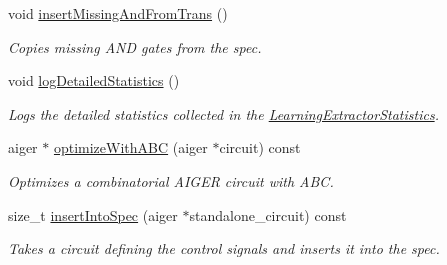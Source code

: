 \begin{DoxyCompactItemize}
void \hyperlink{classLearningImplExtractor_a8b95b5433b25e475efaaba9c553c4e63}{insert\-Missing\-And\-From\-Trans} ()
\begin{DoxyCompactList}\small\item\em Copies missing A\-N\-D gates from the spec. \end{DoxyCompactList}\item 
void \hyperlink{classLearningImplExtractor_aa14318d81871fc52f0d17fd5d82708e3}{log\-Detailed\-Statistics} ()
\begin{DoxyCompactList}\small\item\em Logs the detailed statistics collected in the \hyperlink{classLearningExtractorStatistics}{Learning\-Extractor\-Statistics}. \end{DoxyCompactList}\item 
aiger $\ast$ \hyperlink{classCNFImplExtractor_a58a4e5021d0ef9c4190a5be74fb5a83e}{optimize\-With\-A\-B\-C} (aiger $\ast$circuit) const 
\begin{DoxyCompactList}\small\item\em Optimizes a combinatorial A\-I\-G\-E\-R circuit with A\-B\-C. \end{DoxyCompactList}\item 
size\-\_\-t \hyperlink{classCNFImplExtractor_a0970602635f3356712d57ebb28d12c0d}{insert\-Into\-Spec} (aiger $\ast$standalone\-\_\-circuit) const 
\begin{DoxyCompactList}\small\item\em Takes a circuit defining the control signals and inserts it into the spec. \end{DoxyCompactList}\end{DoxyCompactItemize}
